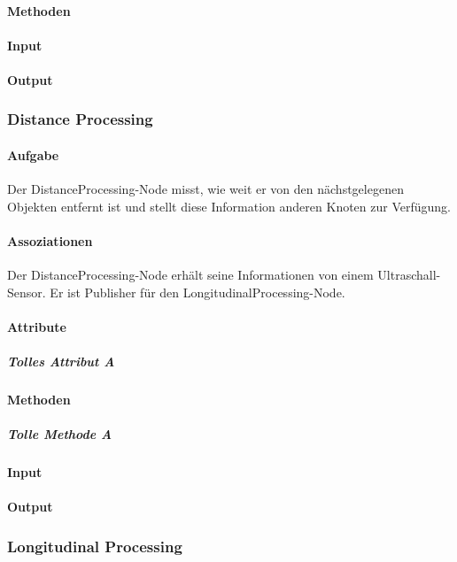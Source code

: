 \documentclass[a4paper, 12pt, titlepage]{scrartcl}
\begin{document}
				\paragraph{Methoden}

				\paragraph{Input}
				\paragraph{Output}

			\subsubsection{Distance Processing}
			\label{distance_processing}
				\paragraph{Aufgabe} Der DistanceProcessing-Node misst, wie weit er von den nächstgelegenen Objekten entfernt ist und stellt diese Information anderen Knoten zur Verfügung. 
				\paragraph{Assoziationen} Der DistanceProcessing-Node erhält seine Informationen von einem Ultraschall-Sensor. Er ist Publisher für den LongitudinalProcessing-Node.  
				\paragraph{Attribute}
					\subparagraph{Tolles Attribut A}
				\paragraph{Methoden}
					\subparagraph{Tolle Methode A}
				\paragraph{Input}
				\paragraph{Output}
			
			\subsubsection{Longitudinal Processing}
			\label{longitudinal_processing}
\end{document}
